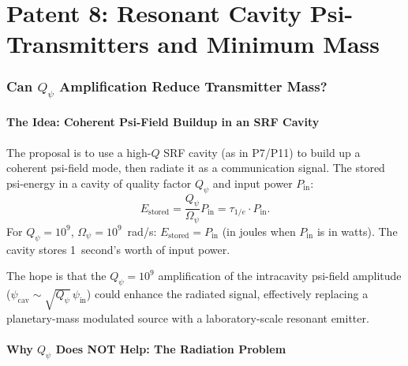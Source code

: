 \documentclass[11pt]{article}
\theoremstyle{definition}
\theoremstyle{remark}
\newcommand{\Qpsi}{Q_\psi}
\newcommand{\Opsi}{\Omega_\psi}
\begin{document}
\part{Patent 8: Resonant Cavity Psi-Transmitters and Minimum Mass}
\label{part:P8}

\section{Can $\Qpsi$ Amplification Reduce Transmitter Mass?}
\label{sec:P8-Qpsi}

\subsection{The Idea: Coherent Psi-Field Buildup in an SRF Cavity}

The proposal is to use a high-$Q$ SRF cavity (as in P7/P11) to build up a
coherent psi-field mode, then radiate it as a communication signal. The
stored psi-energy in a cavity of quality factor $\Qpsi$ and input power
$P_{\mathrm{in}}$:
\begin{equation}
E_{\mathrm{stored}} = \frac{\Qpsi}{\Opsi} P_{\mathrm{in}}
= \tau_{1/e} \cdot P_{\mathrm{in}}.
\label{eq:E-stored}
\end{equation}
For $\Qpsi = 10^9$, $\Opsi = 10^9$~rad/s: $E_{\mathrm{stored}} = P_{\mathrm{in}}$
(in joules when $P_{\mathrm{in}}$ is in watts). The cavity stores 1~second's
worth of input power.

The hope is that the $\Qpsi = 10^9$ amplification of the intracavity
psi-field amplitude ($\psi_{\mathrm{cav}} \sim \sqrt{\Qpsi}\,\psi_{\mathrm{in}}$)
could enhance the radiated signal, effectively replacing a planetary-mass
modulated source with a laboratory-scale resonant emitter.

\subsection{Why $\Qpsi$ Does NOT Help: The Radiation Problem}
\end{document}
